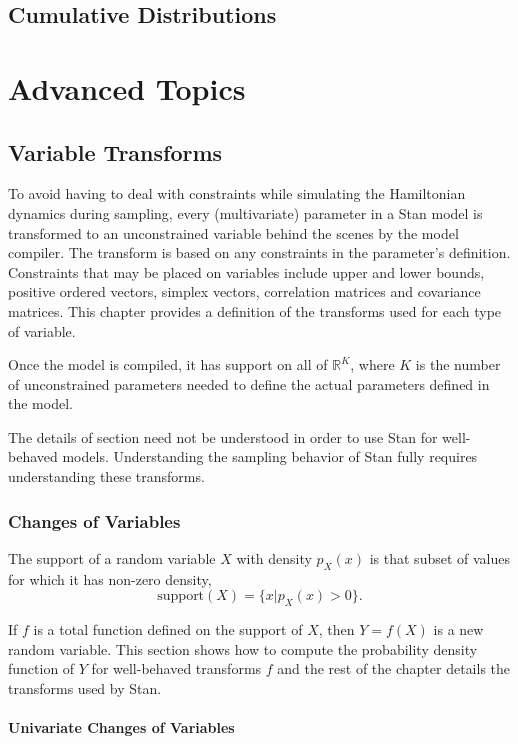 \documentclass[10pt]{report}
\newcommand{\Stan}{Stan\xspace}
\begin{document}
\chapter{Cumulative Distributions}



\part{Advanced Topics}


\chapter{Variable Transforms}

To avoid having to deal with constraints while simulating the
Hamiltonian dynamics during sampling, every (multivariate) parameter
in a \Stan model is transformed to an unconstrained variable behind
the scenes by the model compiler.  The transform is based on any
constraints in the parameter's definition.  Constraints that may be
placed on variables include upper and lower bounds, positive ordered
vectors, simplex vectors, correlation matrices and covariance
matrices.  This chapter provides a definition of the transforms used
for each type of variable.

Once the model is compiled, it has support on all of
$\mathbb{R}^K$, where $K$ is the number of unconstrained parameters
needed to define the actual parameters defined in the model.

The details of section need not be understood in order to use
\Stan for well-behaved models.  Understanding the sampling behavior
of \Stan fully requires understanding these transforms.


\section{Changes of Variables}

The support of a random variable $X$ with density $p_X(x)$ is that
subset of values for which it has non-zero density,
%
\[
\mbox{support}(X) = \{ x | p_X(x) > 0 \}.
\]

If $f$ is a total function defined on the support of $X$, then $Y =
f(X)$ is a new random variable.  This section shows how to compute the
probability density function of $Y$ for well-behaved transforms $f$
and the rest of the chapter details the transforms used by \Stan.



\subsection{Univariate Changes of Variables}
\end{document}
